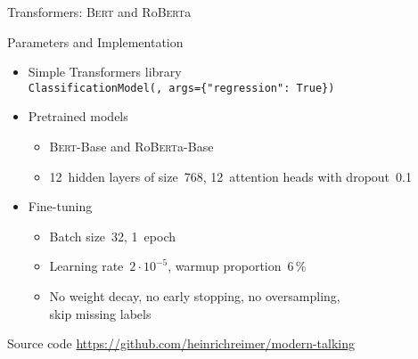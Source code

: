 \documentclass[english,handout]{mlutalk}
\newcommand{\Bert}{\textsc{Bert}\xspace}
\newcommand{\BertBase}{\Bert-Base\xspace}
\newcommand{\Roberta}{\mbox{Ro\textsc{Bert}a}\xspace}
\newcommand{\RobertaBase}{\Roberta-Base\xspace}
\begin{document}
\begin{frame}[allowframebreaks]{Transformers: \Bert and \Roberta}
  \begin{block}{Parameters and Implementation}
    \begin{itemize}
      \item Simple Transformers library \\ {\smaller\texttt{ClassificationModel(\textellipsis,~args=\{"regression":~True\})}}
      \item Pretrained models
      \begin{itemize}
        \item \BertBase and \RobertaBase
        \item 12~hidden layers of size~768, 12~attention heads with dropout~0.1
      \end{itemize}
      \item Fine-tuning
      \begin{itemize}
        \item Batch size~32, 1~epoch
        \item Learning rate~\(2 \cdot 10^{-5}\), warmup proportion~6\,\%
        \item No weight decay, no early stopping, no oversampling, \\ skip missing labels
      \end{itemize}
    \end{itemize}
  \end{block}
  \begin{block}{Source code}
    \smaller
    \url{https://github.com/heinrichreimer/modern-talking}
  \end{block}
\end{frame}
\end{document}

